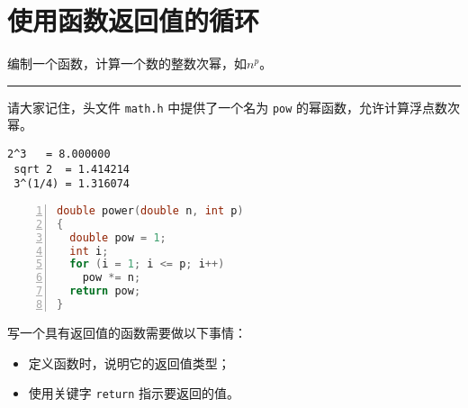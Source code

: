 \section{使用函数返回值的循环}
\begin{frame}[fragile]\ft{\secname}
\begin{free}[例]{}
编制一个函数，计算一个数的整数次幂，如$n^p$。
\end{free}
\rule{\textwidth}{1mm}\pause \vspace{0.1in}

请大家记住，头文件 \lstinline|math.h| 中提供了一个名为 \lstinline|pow| 的幂函数，允许计算浮点数次幂。


\end{frame}


\begin{frame}[fragile]



\end{frame}


\begin{frame}[fragile]
\begin{lstlisting}[backgroundcolor=\color{red!10}]
   2^3   = 8.000000
 sqrt 2  = 1.414214
 3^(1/4) = 1.316074
\end{lstlisting}

\end{frame}


\begin{frame}[fragile]\ft{\secname}
\begin{lstlisting}[language=c,numbers=left,frame=single]
double power(double n, int p)
{
  double pow = 1;
  int i;  
  for (i = 1; i <= p; i++)
    pow *= n;    
  return pow;
}
\end{lstlisting}
\end{frame}


\begin{frame}[fragile]\ft{\secname}
写一个具有返回值的函数需要做以下事情：\vspace{0.1in}

\begin{itemize}
\item 定义函数时，说明它的返回值类型；\\[0.1in]
\item 使用关键字 \lstinline|return| 指示要返回的值。
\end{itemize}
\end{frame}


